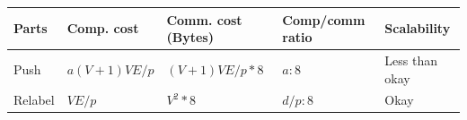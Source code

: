 \documentclass[10pt,oneside]{memoir}
\begin{document}
\begin{longtable}[]{@{}lllll@{}}
\toprule
\begin{minipage}[b]{0.09\columnwidth}\raggedright
Parts\strut
\end{minipage} & \begin{minipage}[b]{0.15\columnwidth}\raggedright
Comp. cost\strut
\end{minipage} & \begin{minipage}[b]{0.19\columnwidth}\raggedright
Comm. cost (Bytes)\strut
\end{minipage} & \begin{minipage}[b]{0.27\columnwidth}\raggedright
Comp/comm ratio\strut
\end{minipage} & \begin{minipage}[b]{0.16\columnwidth}\raggedright
Scalability\strut
\end{minipage}\tabularnewline
\midrule
\endhead
\begin{minipage}[t]{0.09\columnwidth}\raggedright
Push\strut
\end{minipage} & \begin{minipage}[t]{0.15\columnwidth}\raggedright
\(a(V + 1)VE/p\)\strut
\end{minipage} & \begin{minipage}[t]{0.19\columnwidth}\raggedright
\((V+1)VE/p * 8\)\strut
\end{minipage} & \begin{minipage}[t]{0.27\columnwidth}\raggedright
\(a:8\)\strut
\end{minipage} & \begin{minipage}[t]{0.16\columnwidth}\raggedright
Less than okay\strut
\end{minipage}\tabularnewline
\begin{minipage}[t]{0.09\columnwidth}\raggedright
Relabel\strut
\end{minipage} & \begin{minipage}[t]{0.15\columnwidth}\raggedright
\(VE/p\)\strut
\end{minipage} & \begin{minipage}[t]{0.19\columnwidth}\raggedright
\(V^2 * 8\)\strut
\end{minipage} & \begin{minipage}[t]{0.27\columnwidth}\raggedright
\(d/p : 8\)\strut
\end{minipage} & \begin{minipage}[t]{0.16\columnwidth}\raggedright
Okay\strut
\end{minipage}\tabularnewline

\end{longtable}
\end{document}
